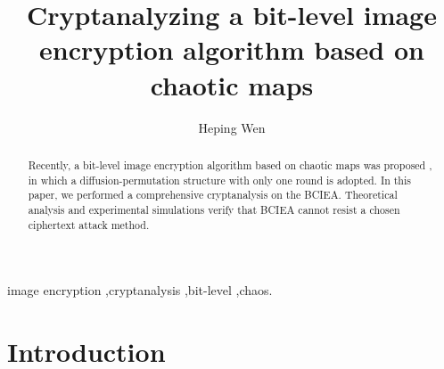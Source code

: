 \documentclass[final,3p,times]{elsarticle}
\begin{document}
\begin{frontmatter}

\title{Cryptanalyzing a bit-level image encryption algorithm based on chaotic maps}

\author[zsi,uestc]{Heping Wen}




\address[zsi]{School of Electronic and Information Engineering, University of Electronic Science and Technology of China, Zhongshan Institute, \\ Zhongshan 528402, China}

\address[uestc]{School of Information and Communication Engineering, University of Electronic Science and Technology of China, Chengdu 611731, China}

\begin{abstract}

Recently, a bit-level image encryption algorithm based on chaotic maps was proposed \cite{LuX2016OLE}, in which a diffusion-permutation structure with only one round is adopted. In this paper, we performed a comprehensive cryptanalysis on the BCIEA. Theoretical analysis and experimental simulations verify that BCIEA cannot resist a chosen ciphertext attack method.


\end{abstract}
\begin{keyword}
image encryption \sep cryptanalysis \sep bit-level \sep chaos.
\end{keyword}
\end{frontmatter}

\section{Introduction}
\label{sec:intro}
\end{document}
